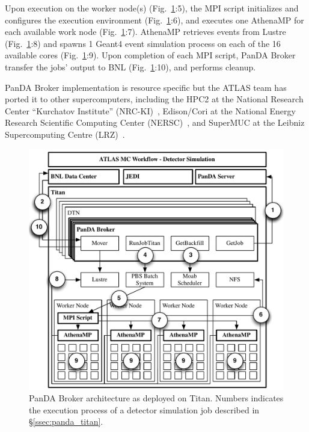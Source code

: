 Upon execution on the worker node(s) (Fig.~\ref{fig:panda_broker}:5), the MPI
script initializes and configures the execution environment
(Fig.~\ref{fig:panda_broker}:6), and executes one AthenaMP for each available
work node (Fig.~\ref{fig:panda_broker}:7). AthenaMP retrieves events from
Lustre (Fig.~\ref{fig:panda_broker}:8) and spawns 1 Geant4 event simulation
process on each of the 16 available cores (Fig.~\ref{fig:panda_broker}:9).
Upon completion of each MPI script, PanDA Broker transfer the jobs' output to
BNL (Fig.~\ref{fig:panda_broker}:10), and performs cleanup.

PanDA Broker implementation is resource specific but the ATLAS team has
ported it to other supercomputers, including the HPC2 at the National
Research Center ``Kurchatov Institute''
(NRC-KI)~\cite{belyaev2015integration}, Edison/Cori at the National Energy
Research Scientific Computing Center (NERSC)~\cite{barreiro2016panda}, and
SuperMUC at the Leibniz Supercomputing Centre (LRZ)~\cite{barreiro2016panda}.

\begin{figure}
    \centering
    \includegraphics[width=\columnwidth]{figures/panda_broker_architecture.pdf}
    \vspace{-0.3in}
    \caption{PanDA Broker architecture as deployed on Titan. Numbers
    indicates the execution process of a detector simulation job described in
    \S\ref{ssec:panda_titan}.}\label{fig:panda_broker}
\end{figure}
\vspace{-0.04in}
